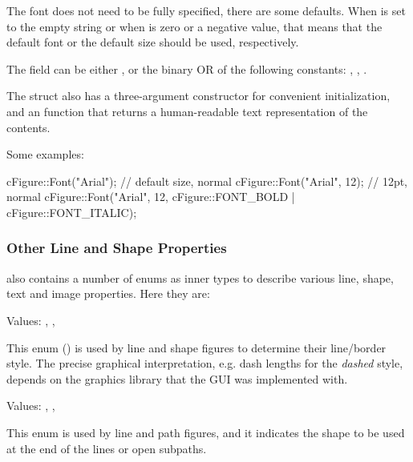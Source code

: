 The font does not need to be fully specified, there are some defaults. When
 is set to the empty string or when  is zero
or a negative value, that means that the default font or the default size
should be used, respectively.

The  field can be either , or the binary OR of
the following constants: , ,
.

The struct also has a three-argument constructor for convenient
initialization, and an  function that returns a human-readable
text representation of the contents.

Some examples:

\begin{cpp}
cFigure::Font("Arial");  // default size, normal
cFigure::Font("Arial", 12);  // 12pt, normal
cFigure::Font("Arial", 12, cFigure::FONT_BOLD | cFigure::FONT_ITALIC);
\end{cpp}


\subsubsection{Other Line and Shape Properties}
\label{sec:graphics:canvas-line-and-shape-properties}

 also contains a number of enums as inner types to describe
various line, shape, text and image properties. Here they are:


Values: , , 

This enum () is used by line and shape figures
to determine their line/border style. The precise graphical interpretation,
e.g. dash lengths for the \textit{dashed} style, depends on the graphics
library that the GUI was implemented with.


Values: , , 

This enum is used by line and path figures, and it indicates the shape to
be used at the end of the lines or open subpaths.

\begin{center}
\end{center}



